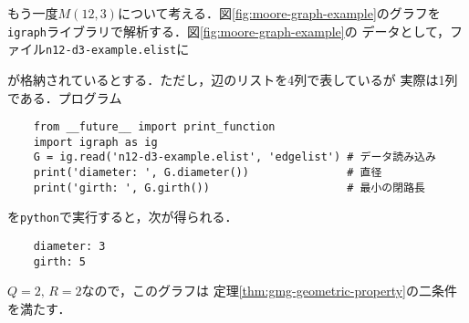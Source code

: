 \begin{example}
  もう一度$M(12,3)$について考える．図\ref{fig:moore-graph-example}のグラフを
  \verb|igraph|ライブラリで解析する．図\ref{fig:moore-graph-example}の
  データとして，ファイル\verb|n12-d3-example.elist|に
  \begin{multicols}{4}
    
  \end{multicols}
  が格納されているとする．ただし，辺のリストを4列で表しているが
  実際は1列である．プログラム
  \begin{verbatim}
    from __future__ import print_function
    import igraph as ig
    G = ig.read('n12-d3-example.elist', 'edgelist') # データ読み込み
    print('diameter: ', G.diameter())               # 直径
    print('girth: ', G.girth())                     # 最小の閉路長
  \end{verbatim}
  を\verb|python|で実行すると，次が得られる．
  \begin{verbatim}
    diameter: 3
    girth: 5
  \end{verbatim}
  $Q=2,\,R=2$なので，このグラフは
  定理\ref{thm:gmg-geometric-property}の二条件を満たす．
\end{example}

